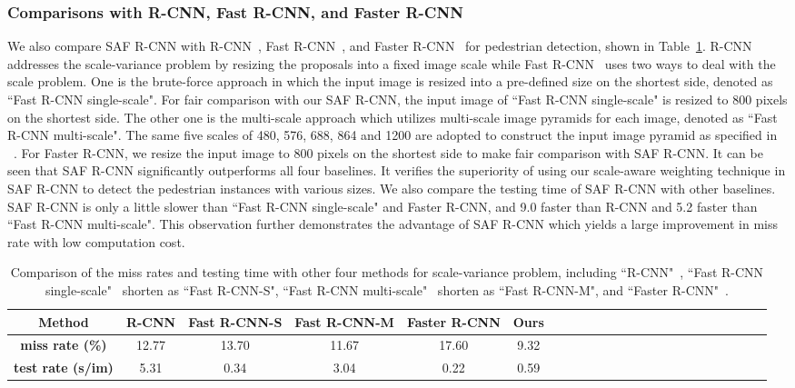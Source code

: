 \documentclass[journal]{IEEEtran}
\begin{document}
\subsubsection{Comparisons with R-CNN, Fast R-CNN, and Faster R-CNN}
We also compare SAF R-CNN with R-CNN~\cite{girshick2014rich}, Fast R-CNN~\cite{girshick2015fast}, and Faster R-CNN~\cite{ren2015faster} for pedestrian detection, shown in Table~\ref{tab:fast_rcnn}. R-CNN~\cite{girshick2014rich} addresses the scale-variance problem by resizing the proposals into a fixed image scale while Fast R-CNN~\cite{girshick2015fast} uses two ways to deal with the scale problem. One is the brute-force approach in which the input image is resized into a pre-defined size on the shortest side, denoted as ``Fast R-CNN single-scale". For fair comparison with our SAF R-CNN, the input image of ``Fast R-CNN single-scale" is resized to 800 pixels on the shortest side. The other one is the multi-scale approach which utilizes multi-scale image pyramids for each image, denoted as ``Fast R-CNN multi-scale". The same five scales of 480, 576, 688, 864 and 1200 are adopted to construct the input image pyramid as specified in ~\cite{he2014spatial}. For Faster R-CNN, we resize the input image to 800 pixels on the shortest side to make fair comparison with SAF R-CNN. It can be seen that SAF R-CNN significantly outperforms all four baselines. It verifies the superiority of using our scale-aware weighting technique in SAF R-CNN to detect the pedestrian instances with various sizes. We also compare the testing time of SAF R-CNN with other baselines. SAF R-CNN is only a little slower than ``Fast R-CNN single-scale" and Faster R-CNN, and 9.0 faster than R-CNN and 5.2 faster than ``Fast R-CNN multi-scale". This observation further demonstrates the advantage of SAF R-CNN which yields a large improvement in miss rate with low computation cost.

\begin{table}\setlength{\tabcolsep}{3pt}
	\centering\scriptsize
	\caption{Comparison of the miss rates and testing time with other four methods for scale-variance problem, including ``R-CNN"~\cite{girshick2014rich}, ``Fast R-CNN single-scale"~\cite{girshick2015fast} shorten as ``Fast R-CNN-S", ``Fast R-CNN multi-scale"~\cite{girshick2015fast} shorten as ``Fast R-CNN-M", and ``Faster R-CNN"~\cite{ren2015faster}.}\label{tab:fast_rcnn}
	\renewcommand{\arraystretch}{1.3}
	\begin{tabular}{c|c|c|c|c|cccccccccccccccccc}
\hline
		\textbf{Method} &\textbf{R-CNN} &\textbf{Fast R-CNN-S} &\textbf{Fast R-CNN-M} &\textbf{Faster R-CNN} &\textbf{Ours} \\
		\hline
		\textbf{miss rate (\%)} & 12.77 & 13.70 & 11.67 & 17.60 & 9.32 \\
		\textbf{test rate (s/im)}  & 5.31 & 0.34 & 3.04 & 0.22 & 0.59 \\
\hline
	\end{tabular}\end{table}
\end{document}
